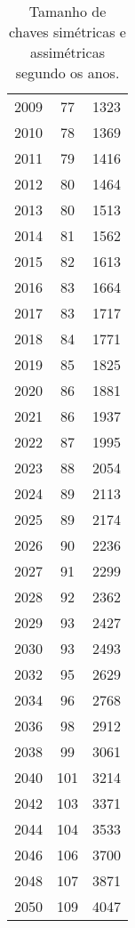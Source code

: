 \begin{table}
\begin{tabular}{ccc}
                2009 & 77 & 1323\\
                2010 & 78 & 1369\\
                2011 & 79 & 1416\\
                2012 & 80 & 1464\\
                2013 & 80 & 1513\\
                2014 & 81 & 1562\\
                2015 & 82 & 1613\\
                2016 & 83 & 1664\\
                2017 & 83 & 1717\\
                2018 & 84 & 1771\\
                2019 & 85 & 1825\\
                2020 & 86 & 1881\\
                2021 & 86 & 1937\\
                2022 & 87 & 1995\\
                2023 & 88 & 2054\\
                2024 & 89 & 2113\\
                2025 & 89 & 2174\\
                2026 & 90 & 2236\\
                2027 & 91 & 2299\\
                2028 & 92 & 2362\\
                2029 & 93 & 2427\\
                2030 & 93 & 2493\\
                2032 & 95 & 2629\\
                2034 & 96 & 2768\\
                2036 & 98 & 2912\\
                2038 & 99 & 3061\\
                2040 & 101 & 3214\\
                2042 & 103 & 3371\\
                2044 & 104 & 3533\\
                2046 & 106 & 3700\\
                2048 & 107 & 3871\\
                2050 & 109 & 4047\\
                \bottomrule
        \end{tabular}
        \caption{Tamanho de chaves simétricas e assimétricas segundo os anos.}
\end{table}

